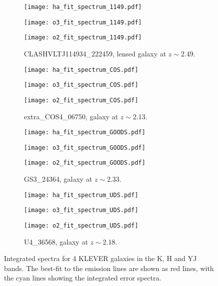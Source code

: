 \documentclass[usenatbib]{mnras} %
\begin{document}
\begin{figure*}

    
    \begin{subfigure}{0.48\textwidth}
      \centering
      \texttt{[image: ha\_fit\_spectrum\_1149.pdf]}\par
      \vspace*{-4.2mm}
      \texttt{[image: o3\_fit\_spectrum\_1149.pdf]}\par
      \vspace*{-4.2mm}
      \texttt{[image: o2\_fit\_spectrum\_1149.pdf]}\par
      \centering
      \caption{CLASHVLTJ114934\_222459, lensed galaxy at $z\sim$2.49.}
      \label{fig:sub-macs}
    \end{subfigure}\quad
    \begin{subfigure}{0.48\textwidth}
      \centering
      \texttt{[image: ha\_fit\_spectrum\_COS.pdf]}\par
      \vspace*{-4.2mm}
      \texttt{[image: o3\_fit\_spectrum\_COS.pdf]}\par
      \vspace*{-4.2mm}
      \texttt{[image: o2\_fit\_spectrum\_COS.pdf]}\par
      \caption{extra\_COS4\_06750, galaxy at $z\sim$2.13.}
      \label{fig:sub-cosmos}
    \end{subfigure}\quad
    \begin{subfigure}{0.48\textwidth}
      \centering
      \texttt{[image: ha\_fit\_spectrum\_GOODS.pdf]}\par
      \vspace*{-4.2mm}
      \texttt{[image: o3\_fit\_spectrum\_GOODS.pdf]}\par
      \vspace*{-4.2mm}
      \texttt{[image: o2\_fit\_spectrum\_GOODS.pdf]}\par
      \caption{GS3\_24364, galaxy at $z\sim$2.33.}
      \label{fig:sub-goods}
    \end{subfigure}\quad
    \begin{subfigure}{0.48\textwidth}
      \centering
      \texttt{[image: ha\_fit\_spectrum\_UDS.pdf]}\par
      \vspace*{-4.2mm}
      \texttt{[image: o3\_fit\_spectrum\_UDS.pdf]}\par
      \vspace*{-4.2mm}
      \texttt{[image: o2\_fit\_spectrum\_UDS.pdf]}\par
      \caption{U4\_36568, galaxy at $z\sim$2.18.}
      \label{fig:sub-UDS}
    \end{subfigure}\quad

    \caption{Integrated spectra for 4 KLEVER galaxies in the K, H and YJ bands. The best-fit to the emission lines are shown as red lines, with the cyan lines showing the integrated error spectra.}
    \label{spectra}
\end{figure*}
\end{document}
